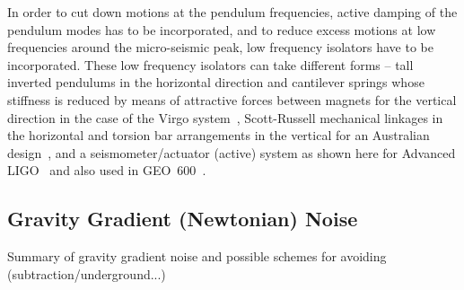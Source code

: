 \documentclass{article}
\begin{document}

In order to cut down motions at the pendulum frequencies, active
damping of the pendulum modes has to be incorporated, and to reduce
excess motions at low frequencies around the micro-seismic peak, low
frequency isolators have to be incorporated. These low frequency
isolators can take different forms -- tall inverted pendulums in the
horizontal direction and cantilever springs whose stiffness is reduced
by means of attractive forces between magnets for the vertical
direction in the case of the Virgo system~\cite{Losurdo},
Scott-Russell mechanical linkages in the horizontal and torsion bar
arrangements in the vertical for an Australian
design~\cite{Winterflood}, and a seismometer/actuator (active) system as shown here for Advanced LIGO~\cite{Abbott:2002} and also used in
GEO~600~\cite{Plissi2}.


\subsection{Gravity Gradient (Newtonian) Noise}
\label{subsection:gravitygradient}

Summary of gravity gradient noise and possible schemes for avoiding (subtraction/underground...)

\end{document}
